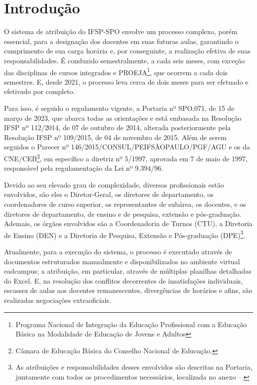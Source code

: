 \documentclass[12pt]{article}
\begin{document}
\section{Introdução}
\par O sistema de atribuição do IFSP-SPO envolve um processo complexo, porém essencial, para a designação dos docentes em suas futuras aulas, garantindo o cumprimento de sua carga horária e, por conseguinte, a realização efetiva de suas responsabilidades. É conduzido semestralmente, a cada seis meses, com exceção das disciplinas de cursos integrados e PROEJA\footnote{Programa Nacional de Integração da Educação Profissional com a Educação Básica na Modalidade de Educação de Jovens e Adultos}, que ocorrem a cada dois semestres. E, desde 2021, o processo leva cerca de dois meses para ser efetuado e efetivado por completo.
\par Para isso, é seguido o regulamento vigente, a Portaria nº SPO.071, de 15 de março de 2023, que abarca todas as orientações e está embasada na Resolução IFSP nº 112/2014, de 07 de outubro de 2014, alterada posteriormente pela Resolução IFSP nº 109/2015, de 04 de novembro de 2015. Além de serem seguidos o Parecer nº 146/2015/CONSUL/PEIFSÃOPAULO/PGF/AGU e os da CNE/CEB\footnote{Câmara de Educação Básica do Conselho Nacional de Educação.}, em específico a diretriz nº 5/1997, aprovada em 7 de maio de 1997, responsável pela regulamentação da Lei nº 9.394/96.
\par Devido ao seu elevado grau de complexidade, diversos profissionais estão envolvidos, são eles o Diretor-Geral, os diretores de departamento, os coordenadores de curso superior, os representantes de subárea, os docentes, e os diretores de departamento, de ensino e de pesquisa, extensão e pós-graduação. Ademais, os órgãos envolvidos são a Coordenadoria de Turnos (CTU), a Diretoria de Ensino (DEN) e a Diretoria de Pesquisa, Extensão e Pós-graduação (DPE)\footnote{ As atribuições e responsabilidades desses envolvidos são descritas na Portaria, juntamente com todos os procedimentos necessários, localizada no anexo --.}.
\par Atualmente, para a execução do sistema, o processo é executado através de documentos estruturados manualmente e disponibilizados no ambiente virtual eadcampus; a atribuição, em particular, através de múltiplas planilhas detalhadas do Excel. E, na resolução dos conflitos decorrentes de insatisfações individuais, escassez de aulas aos docentes remanescentes, divergências de horários e afins, são realizadas negociações extraoficiais.
\end{document}
